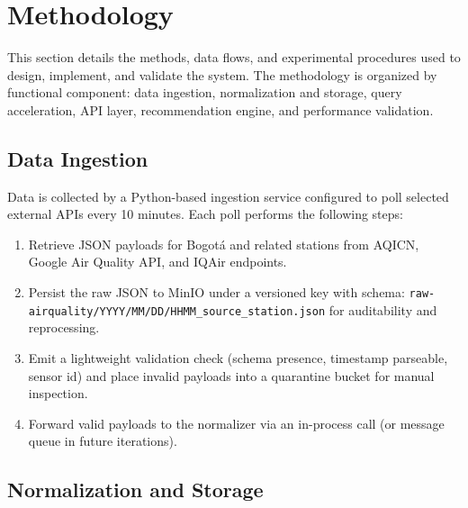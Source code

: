 \section{Methodology}
\label{sec:method_method}

This section details the methods, data flows, and experimental procedures used to design, implement, and validate the system. The methodology is organized by functional component: data ingestion, normalization and storage, query acceleration, API layer, recommendation engine, and performance validation.

\subsection{Data Ingestion}
\label{subsec:method_ingest}

Data is collected by a Python-based ingestion service configured to poll selected external APIs every 10 minutes. Each poll performs the following steps:
\begin{enumerate}
    \item Retrieve JSON payloads for Bogotá and related stations from AQICN, Google Air Quality API, and IQAir endpoints.
    \item Persist the raw JSON to MinIO under a versioned key with schema: \texttt{raw-airquality/YYYY/MM/DD/HHMM\_source\_station.json} for auditability and reprocessing.
    \item Emit a lightweight validation check (schema presence, timestamp parseable, sensor id) and place invalid payloads into a quarantine bucket for manual inspection.
    \item Forward valid payloads to the normalizer via an in-process call (or message queue in future iterations).
\end{enumerate}

\subsection{Normalization and Storage}
\label{subsec:method_normalization}

